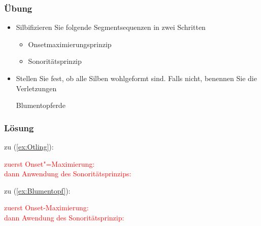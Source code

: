 


\begin{frame}
\frametitle{Übung}

\begin{itemize}
	\item Silbifizieren Sie folgende Segmentsequenzen in zwei Schritten
	\begin{itemize}
		\item Onsetmaximierungsprinzip
		\item Sonoritätsprinzip
	\end{itemize}

\item Stellen Sie fest, ob alle Silben wohlgeformt sind. Falls nicht, benennen Sie die Verletzungen
	
\ea\label{ex:Otling}
\z

	\ea\label{ex:Blumentopf}
	Blumentopferde
	\z

\end{itemize}



\end{frame}


\begin{frame}
\frametitle{Lösung}

zu (\ref{ex:Otling}):

\textcolor{red}{zuerst Onset"=Maximierung: }\\
\textcolor{red}{dann Anwendung des Sonoritätsprinzips: }

zu (\ref{ex:Blumentopf}): 

\textcolor{red}{zuerst Onset-Maximierung: }\\
\textcolor{red}{dann Awendung des Sonoritätsprinzip: }






\end{frame}
	




